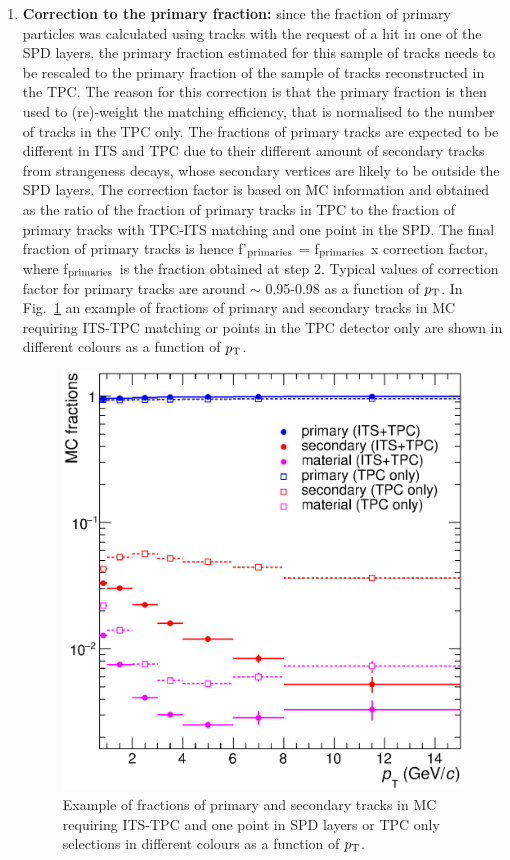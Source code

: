 \begin{enumerate}
\item {\bf Correction to the primary fraction:} since the fraction of primary
 particles was calculated using tracks with the request of a hit in one of the SPD layers, 
the primary fraction estimated for this sample of tracks 
needs to be rescaled to the primary fraction of the sample of tracks reconstructed in the TPC.
The reason for this correction is that the primary fraction is then used 
to (re)-weight the matching efficiency, that is normalised to the number of tracks in the TPC only. 
The fractions of primary tracks are expected to 
be different in ITS and TPC due to their different amount of 
secondary tracks from strangeness decays,
whose secondary vertices are likely to be outside the SPD layers. 
The correction factor is based on MC information and obtained as 
the ratio of the fraction of primary tracks in TPC to the fraction of primary
 tracks with TPC-ITS matching and one point in the SPD. The final fraction of primary tracks is hence
  f'$_{\rm primaries}$ = f$_{\rm primaries}$ x correction factor, 
  where f$_{\rm primaries}$ is the fraction obtained at step 2. 
  Typical values of correction factor for primary tracks are around $\sim$ 0.95-0.98
  as a function of $p_{\rm T}$. 
  In Fig.~\ref{fig:MCfractions} an example of fractions of primary 
  and secondary tracks in MC requiring ITS-TPC matching or points in the TPC detector only are 
  shown in different colours as a function of $p_{\rm T}$.
\begin{figure}[!htb]
\begin{center}
\includegraphics[width=.50\textwidth]{FigCap4/MCfractions_ESDTrOnly_VsPt_PiK.eps}
\caption{Example of fractions of primary and secondary tracks in MC requiring ITS-TPC and one point in SPD layers or TPC only selections in different colours as a function of $p_{\rm T}$.}
\label{fig:MCfractions}
\end{center}
\end{figure}


\end{enumerate}
